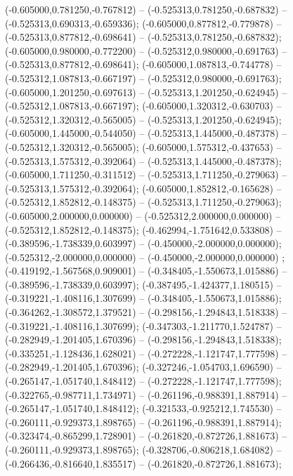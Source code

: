  (-0.605000,0.781250,-0.767812) -- (-0.525313,0.781250,-0.687832) -- (-0.525313,0.690313,-0.659336);
 (-0.605000,0.877812,-0.779878) -- (-0.525313,0.877812,-0.698641) -- (-0.525313,0.781250,-0.687832);
 (-0.605000,0.980000,-0.772200) -- (-0.525312,0.980000,-0.691763) -- (-0.525313,0.877812,-0.698641);
 (-0.605000,1.087813,-0.744778) -- (-0.525312,1.087813,-0.667197) -- (-0.525312,0.980000,-0.691763);
 (-0.605000,1.201250,-0.697613) -- (-0.525313,1.201250,-0.624945) -- (-0.525312,1.087813,-0.667197);
 (-0.605000,1.320312,-0.630703) -- (-0.525312,1.320312,-0.565005) -- (-0.525313,1.201250,-0.624945);
 (-0.605000,1.445000,-0.544050) -- (-0.525313,1.445000,-0.487378) -- (-0.525312,1.320312,-0.565005);
 (-0.605000,1.575312,-0.437653) -- (-0.525313,1.575312,-0.392064) -- (-0.525313,1.445000,-0.487378);
 (-0.605000,1.711250,-0.311512) -- (-0.525313,1.711250,-0.279063) -- (-0.525313,1.575312,-0.392064);
 (-0.605000,1.852812,-0.165628) -- (-0.525312,1.852812,-0.148375) -- (-0.525313,1.711250,-0.279063);
 (-0.605000,2.000000,0.000000) -- (-0.525312,2.000000,0.000000) -- (-0.525312,1.852812,-0.148375);
 (-0.462994,-1.751642,0.533808) -- (-0.389596,-1.738339,0.603997) -- (-0.450000,-2.000000,0.000000);
 (-0.525312,-2.000000,0.000000) -- (-0.450000,-2.000000,0.000000) ;
 (-0.419192,-1.567568,0.909001) -- (-0.348405,-1.550673,1.015886) -- (-0.389596,-1.738339,0.603997);
 (-0.387495,-1.424377,1.180515) -- (-0.319221,-1.408116,1.307699) -- (-0.348405,-1.550673,1.015886);
 (-0.364262,-1.308572,1.379521) -- (-0.298156,-1.294843,1.518338) -- (-0.319221,-1.408116,1.307699);
 (-0.347303,-1.211770,1.524787) -- (-0.282949,-1.201405,1.670396) -- (-0.298156,-1.294843,1.518338);
 (-0.335251,-1.128436,1.628021) -- (-0.272228,-1.121747,1.777598) -- (-0.282949,-1.201405,1.670396);
 (-0.327246,-1.054703,1.696590) -- (-0.265147,-1.051740,1.848412) -- (-0.272228,-1.121747,1.777598);
 (-0.322765,-0.987711,1.734971) -- (-0.261196,-0.988391,1.887914) -- (-0.265147,-1.051740,1.848412);
 (-0.321533,-0.925212,1.745530) -- (-0.260111,-0.929373,1.898765) -- (-0.261196,-0.988391,1.887914);
 (-0.323474,-0.865299,1.728901) -- (-0.261820,-0.872726,1.881673) -- (-0.260111,-0.929373,1.898765);
 (-0.328706,-0.806218,1.684082) -- (-0.266436,-0.816640,1.835517) -- (-0.261820,-0.872726,1.881673);

